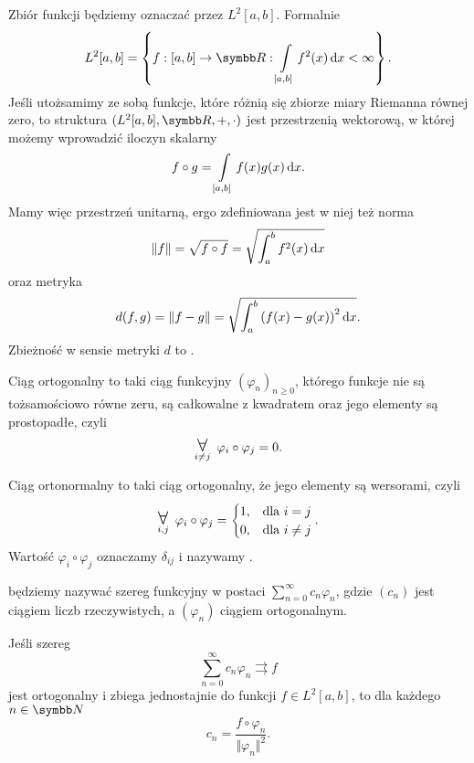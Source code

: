 Zbiór funkcji  będziemy oznaczać przez $L^2[a, b]$. Formalnie
\[ L^2[a, b] = \left\{f: [a, b] \to \RR : \int\limits_{[a, b]} f^2(x) \d x < \infty \right\}. \]
Jeśli utożsamimy ze sobą funkcje, które różnią się zbiorze miary Riemanna równej zero, to struktura $(L^2[a, b], \RR, +, \cdot)$ jest przestrzenią wektorową, w której możemy wprowadzić iloczyn skalarny
\[ f \circ g = \int\limits_{[a, b]} f(x)g(x) \operatorname{d}\!{x}. \]
Mamy więc przestrzeń unitarną, ergo zdefiniowana jest w niej też norma
\[ \Vert f \Vert = \sqrt{f \circ f} = \sqrt{\int_a^b f^2(x) \operatorname{d}\!{x}} \]
oraz metryka
\[ d(f, g) = \Vert f - g \Vert = \sqrt{\int_a^b \left(f(x) - g(x)\right)^2 \operatorname{d}\!{x}}. \]
Zbieżność w sensie metryki $d$ to .

\begin{definition}
    Ciąg ortogonalny to taki ciąg funkcyjny $(\varphi_n)_{n\geq 0}$, którego funkcje nie są tożsamościowo równe zeru, są całkowalne z kwadratem oraz jego elementy są prostopadłe, czyli
    \[ \dforall{i \neq j} \varphi_i \circ \varphi_j = 0. \]
\end{definition}

\begin{definition}
    Ciąg ortonormalny to taki ciąg ortogonalny, że jego elementy są wersorami, czyli
    \[ \dforall{i, j} \varphi_i \circ \varphi_j = \begin{cases}1, & \text{dla } i = j \\ 0, & \text{dla } i \neq j\end{cases}. \]
    Wartość $\varphi_i \circ \varphi_j$ oznaczamy $\delta_{ij}$ i nazywamy .
\end{definition}

 będziemy nazywać szereg funkcyjny w postaci $\sum_{n=0}^\infty c_n\varphi_n$, gdzie $(c_n)$ jest ciągiem liczb rzeczywistych, a $(\varphi_n)$ ciągiem ortogonalnym.

\begin{theorem}
    \label{t:Euler-Fourier}
    Jeśli szereg
    \[ \sum_{n=0}^\infty c_n\varphi_n \rightrightarrows f \]
    jest ortogonalny i zbiega jednostajnie do funkcji $f \in L^2[a, b]$, to dla każdego $n \in \NN$
    \[ c_n = \frac{f \circ \varphi_n}{\Vert \varphi_n \Vert^2}. \]
\end{theorem}

